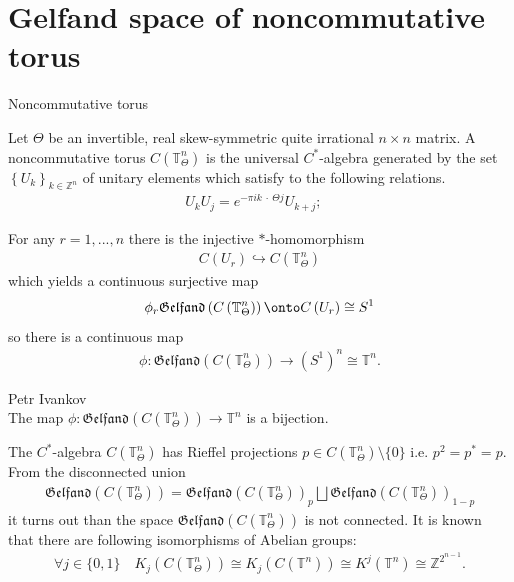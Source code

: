 \documentclass{beamer}
\theoremstyle{plain}
\newcommand{\Z}{\mathbb{Z}}
\newcommand{\bean}{\begin{eqnarray*}}
\newcommand{\eean}{\end{eqnarray*}}
\newcommand{\T}{\mathbb{T}}
\newcommand{\hookto}{\hookrightarrow}        %
\begin{document}
\section{Gelfand space of noncommutative torus}
\begin{frame}	{\Large Noncommutative torus} 
	\begin{definition}
	Let $\Theta$ be an invertible, real  skew-symmetric quite irrational $n \times n$ matrix. A \alert{noncommutative torus} $C\left(\mathbb{T}^n_{\Theta}\right)$ is the universal $C^*$-algebra generated by the set $\left\{U_k\right\}_{k \in \Z^n}$ of unitary elements which satisfy to the following relations.
	\bean\label{nt_unitary_product_eqn}
		U_k U_j = e^{-\pi ik ~\cdot~ \Theta j} U_{k + j}; ~~~   \
		\eean
\end{definition}
For any $r=1,...,n$ there is the injective  $*$-homomorphism 
\bean
C\left( U_r\right) \hookto C\left(\mathbb{T}^n_{\Theta}\right)
\eean
which yields a continuous surjective map 
\bean
\phi_r\mathfrak{Gelfand}\left(C\left(\mathbb{T}^n_{\Theta}\right)\right)\onto C\left(U_r\right)\cong S^1
\eean 
so there is a continuous map
\bean
\phi : \mathfrak{Gelfand}\left(C\left(\mathbb{T}^n_{\Theta}\right)\right)\to\left(S^1 \right)^n \cong \T^n. 
\eean 
\end{frame}
\begin{frame}
	\begin{lemma}\alert{Petr Ivankov}\\
		The map $\phi : \mathfrak{Gelfand}\left(C\left(\mathbb{T}^n_{\Theta}\right)\right)\to \T^n$ is a bijection.
\end{lemma}
The $C^*$-algebra $C\left(\mathbb{T}^n_{\Theta}\right)$ has \alert{Rieffel projections} $p \in C\left(\mathbb{T}^n_{\Theta}\right)\setminus\{0\}$ i.e. $p^2 = p^*=p$. From the disconnected union 
\bean
\mathfrak{Gelfand}\left(C\left(\mathbb{T}^n_{\Theta}\right)\right) = \mathfrak{Gelfand}\left(C\left(\mathbb{T}^n_{\Theta}\right)\right)_p \bigsqcup \mathfrak{Gelfand}\left(C\left(\mathbb{T}^n_{\Theta}\right)\right)_{1-p}
\eean 
it turns out than the space $\mathfrak{Gelfand}\left(C\left(\mathbb{T}^n_{\Theta}\right)\right)$ is not connected. It is known that there are following isomorphisms of Abelian groups:
\bean
\forall j \in \{0,1\} \quad  K_j\left( C\left(\mathbb{T}^n_{\Theta}\right)\right) \cong K_j\left( C\left(\mathbb{T}^n\right)\right)\cong K^j\left(\T^n \right) \cong \Z^{2^{n-1}}.
\eean 
\end{frame}
\end{document}
